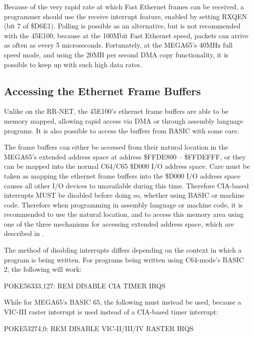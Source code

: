 Because of the very rapid rate at which Fast Ethernet frames can be received, a programmer should use the
receive interrupt feature, enabled by setting RXQEN (bit 7 of \$D6E1).  Polling is possible as an alternative, but
is not recommended with the 45E100, because at the 100Mbit Fast Ethernet speed, packets can arrive
as often as every 5 microseconds.  Fortunately, at the MEGA65's 40MHz full speed mode, and using
the 20MB per second DMA copy functionality, it is possible to keep up with such high data rates.

\subsection{Accessing the Ethernet Frame Buffers}

Unlike on the RR-NET, the 45E100's ethernet frame buffers are able to be memory mapped, allowing rapid access via DMA
or through assembly language programs.  It is also possible to access the buffers from BASIC with some care.

The frame buffers can either be accessed from their natural location in the MEGA65's extended address space at address
\$FFDE800 -- \$FFDEFFF, or they can be mapped into the normal C64/C65 \$D000 I/O address space.  Care must be
taken as mapping the ethernet frame buffers into the \$D000 I/O address space causes all other I/O devices to unavailable
during this time.  Therefore CIA-based interrupts MUST be disabled before doing so, whether using BASIC or machine code.  Therefore
when programming in assembly language or machine code, it is recommended to use the natural location, and to access this
memory area using one of the three mechanisms for accessing extended address space, which are described in .

The method of
disabling interrupts differs depending on the context in which a program is being written. For programs being written using C64-mode's BASIC 2, the following will work:

\begin{screenoutput}
  POKE56333,127: REM DISABLE CIA TIMER IRQS
\end{screenoutput}

While for MEGA65's BASIC 65, the following must instead be used, because a VIC-III raster interrupt is used instead of a CIA-based timer interrupt:

\begin{screenoutput}
POKE53274,0: REM DISABLE VIC-II/III/IV RASTER IRQS
\end{screenoutput}

